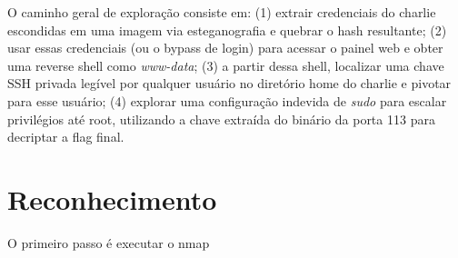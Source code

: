 \documentclass[12pt]{article} %
\begin{document}
O caminho geral de exploração consiste em: (1) extrair credenciais do charlie escondidas em uma imagem via esteganografia e quebrar o hash resultante; (2) usar essas credenciais (ou o bypass de login) para acessar o painel web e obter uma reverse shell como \textit{www-data}; (3) a partir dessa shell, localizar uma chave SSH privada legível por qualquer usuário no diretório home do charlie e pivotar para esse usuário; (4) explorar uma configuração indevida de \textit{sudo} para escalar privilégios até root, utilizando a chave extraída do binário da porta 113 para decriptar a flag final.

\section{Reconhecimento}

O primeiro passo é executar o nmap
\end{document}
